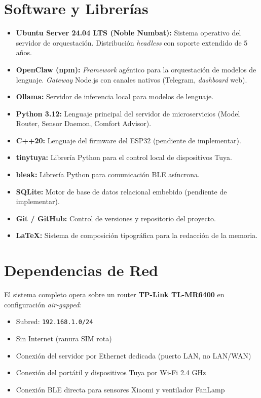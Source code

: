 \section{Software y Librerías}

\begin{itemize}
    \item \textbf{Ubuntu Server 24.04 LTS (Noble Numbat):} Sistema operativo del servidor de orquestación. Distribución \textit{headless} con soporte extendido de 5 años.
    \item \textbf{OpenClaw (npm):} \textit{Framework} agéntico para la orquestación de modelos de lenguaje. \textit{Gateway} Node.js con canales nativos (Telegram, \textit{dashboard} web).
    \item \textbf{Ollama:} Servidor de inferencia local para modelos de lenguaje.
    \item \textbf{Python 3.12:} Lenguaje principal del servidor de microservicios (Model Router, Sensor Daemon, Comfort Advisor).
    \item \textbf{C++20:} Lenguaje del firmware del ESP32 (pendiente de implementar).
    \item \textbf{tinytuya:} Librería Python para el control local de dispositivos Tuya.
    \item \textbf{bleak:} Librería Python para comunicación BLE asíncrona.
    \item \textbf{SQLite:} Motor de base de datos relacional embebido (pendiente de implementar).
    \item \textbf{Git / GitHub:} Control de versiones y repositorio del proyecto.
    \item \textbf{\LaTeX:} Sistema de composición tipográfica para la redacción de la memoria.
\end{itemize}

\section{Dependencias de Red}

El sistema completo opera sobre un router \textbf{TP-Link TL-MR6400} en configuración \textit{air-gapped}:
\begin{itemize}
    \item Subred: \texttt{192.168.1.0/24}
    \item \textsf{Sin Internet} (ranura SIM rota)
    \item Conexión del servidor por Ethernet dedicada (puerto LAN, no LAN/WAN)
    \item Conexión del portátil y dispositivos Tuya por Wi-Fi 2.4 GHz
    \item Conexión BLE directa para sensores Xiaomi y ventilador FanLamp
\end{itemize}
